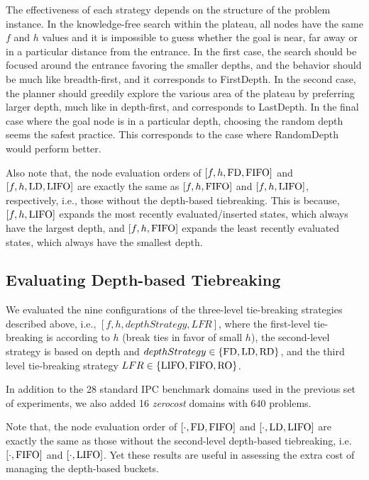 The effectiveness of each strategy depends on the structure of the problem instance.
In the knowledge-free search within the plateau, all nodes have the same
$f$ and $h$ values %
 and it is impossible to guess whether the goal is near, far
away or in a particular distance from the entrance. 
In the first case,
the search should be focused around the entrance favoring the smaller
depths, and the behavior should be much like breadth-first, and it
corresponds to FirstDepth. In the second case, the planner should
greedily explore the various area of the plateau by preferring larger
depth, much like in depth-first, and corresponds to LastDepth. In the
final case where the goal node is in a particular depth, choosing the
random depth seems the safest practice. This corresponds to the case
where RandomDepth would perform better.


Also note that, the node evaluation orders of $[f,h,\mbox{FD},\mbox{FIFO}]$ and $[f,h,\mbox{LD},\mbox{LIFO}]$ are
exactly the same as $[f,h,\mbox{FIFO}]$ and $[f,h,\mbox{LIFO}]$, respectively,
i.e., those without the depth-based tiebreaking.  
This is because, $[f,h,\mbox{LIFO}]$ expands the most recently evaluated/inserted
states, which always have the largest depth, and $[f,h,\mbox{FIFO}]$ expands the least recently
evaluated states, which always have the smallest depth.

 


\subsection{Evaluating Depth-based Tiebreaking}

We evaluated the nine configurations of the three-level tie-breaking strategies described above, i.e., $[f,h,depthStrategy,LFR]$, where the first-level tie-breaking is according to $h$ (break ties in favor of small $h$), the second-level strategy is based on depth and $depthStrategy \in \{\mbox{FD}, \mbox{LD}, \mbox{RD}\}$, and the third level tie-breaking strategy $LFR \in \{\mbox{LIFO}, \mbox{FIFO}, \mbox{RO}\}$.

In addition to the 28 standard IPC benchmark domains used in the previous set of experiments, we also added 16 \emph{zerocost} domains with 640 problems. 

Note that, the node evaluation order of $[\cdot,\mbox{FD},\mbox{FIFO}]$ and $[\cdot,\mbox{LD},\mbox{LIFO}]$
are exactly the same as those without the second-level
depth-based tiebreaking, i.e.\ $[\cdot,\mbox{FIFO}]$ and $[\cdot,\mbox{LIFO}]$.
Yet these results are useful in assessing the extra cost of managing the
depth-based buckets.

